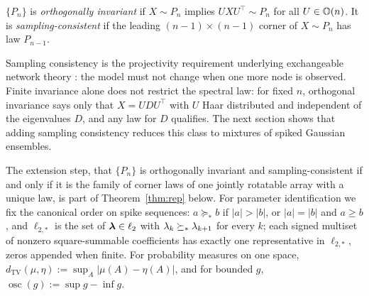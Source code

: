 \begin{definition}
\label{def:consistent}
$\{P_n\}$ is \emph{orthogonally invariant} if $X\sim P_n$ implies
$UXU^\top\sim P_n$ for all $U\in\mathbb{O}(n)$. It is \emph{sampling-consistent}
if the leading $(n-1)\times(n-1)$ corner of $X\sim P_n$ has law $P_{n-1}$.
\end{definition}

Sampling consistency is the projectivity requirement underlying exchangeable
network theory \citep{orbanz2015bayesian}: the model must not change when one
more node is observed. Finite invariance alone does not restrict the
spectral law: for fixed $n$, orthogonal invariance says only that
$X = U D U^\top$ with $U$ Haar distributed and independent of the
eigenvalues $D$, and any law for $D$ qualifies. The next section shows that
adding sampling consistency reduces this class to mixtures of spiked
Gaussian ensembles.

The extension step, that $\{P_n\}$ is orthogonally invariant and
sampling-consistent if and only if it is the family of corner laws of
one jointly rotatable array with a unique law, is part of
Theorem~\ref{thm:rep} below. For parameter identification we fix the
canonical order on spike sequences: $a\succeq_*b$ if $|a|>|b|$, or
$|a|=|b|$ and $a\ge b$, and $\ell_{2,*}$ is the set of
$\bm{\lambda}\in\ell_2$ with $\lambda_k\succeq_*\lambda_{k+1}$ for every $k$; each
signed multiset of nonzero square-summable coefficients has exactly
one representative in $\ell_{2,*}$, zeros appended when finite. For
probability measures on one space,
$d_{\mathrm{TV}}(\mu,\eta):=\sup_A|\mu(A)-\eta(A)|$, and for bounded
$g$, $\operatorname{osc}(g):=\sup g-\inf g$.
